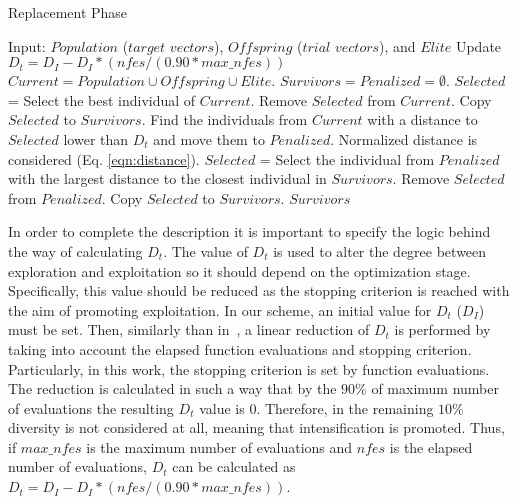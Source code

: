 \begin{algorithm}[t]
  \scriptsize
	\caption{Replacement Phase} \label{alg:Replacement}
	\begin{algorithmic}[1]
	\STATE Input: $Population$ ($target$ $vectors$), $Offspring$ ($trial$ $vectors$), and $Elite$
	\STATE Update $D_t = D_I - D_I *(nfes/(0.90*max\_nfes)) $ 
	\STATE $Current = Population \cup Offspring \cup Elite$.
	\STATE $Survivors = Penalized = \emptyset$.
	   \STATE $Selected$ = Select the best individual of $Current$.
		 \STATE Remove $Selected$ from $Current$.
	   \STATE Copy $Selected$ to $Survivors$.
	   \STATE Find the individuals from $Current$ with a distance to $Selected$ lower than $D_t$ and move them to $Penalized$. Normalized distance is considered (Eq. \ref{eqn:distance}).
	\ENDWHILE
	   \STATE $Selected$ = Select the individual from $Penalized$ with the largest distance to the closest individual in $Survivors$.
		 \STATE Remove $Selected$ from $Penalized$.
	   \STATE Copy $Selected$ to $Survivors$.
	\ENDWHILE
  \RETURN $Survivors$
\end{algorithmic}
\end{algorithm}


In order to complete the description it is important to specify the logic behind the way of calculating $D_t$. 
%
The value of $D_t$ is used to alter the degree between exploration and exploitation so it should depend on the optimization stage.
%
Specifically, this value should be reduced as the stopping criterion is reached with the aim of promoting exploitation.
%
In our scheme, an initial value for $D_t$ ($D_I$) must be set.
%
Then, similarly than in~\cite{segura2016novel}, a linear reduction of $D_t$ is performed by taking into account the elapsed function evaluations and stopping criterion.
%
Particularly, in this work, the stopping criterion is set by function evaluations.
%
The reduction is calculated in such a way that by the $90\%$ of maximum number of evaluations the resulting $D_t$ value is $0$.
%
Therefore, in the remaining $10\%$ diversity is not considered at all, meaning that intensification is promoted.
%
Thus, if $max\_nfes$ is the maximum number of evaluations and $nfes$ is the elapsed number of evaluations, $D_t$ can be calculated as $D_t=D_I - D_I *(nfes/(0.90*max\_nfes))$.
%
%

